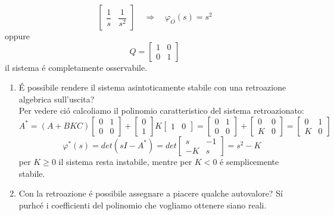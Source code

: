 \documentclass[../main.tex]{subfiles}
\begin{document}
\begin{Exercise}[title={Retroazione algebrica sull'uscita}, difficulty=1]
\begin{itemize}
\[\begin{bmatrix}
							\dfrac{1}{s} & \dfrac{1}{s^2}
						\end{bmatrix}
						\quad\Rightarrow\quad \varphi_O(s) = s^2
					\]
					oppure
					\[
						Q =
						\begin{bmatrix}
							1 & 0\\
							0 & 1
						\end{bmatrix}
					\]
					il sistema \'e completamente osservabile.
			\end{itemize}
			\begin{enumerate}
				\item 
					\'E possibile rendere il sistema asintoticamente stabile con una retroazione algebrica sull'uscita?\\
					Per vedere ci\'o calcoliamo il polinomio caratteristico del sistema retroazionato:
					\[
						A^{*}=(A+BKC)
						\begin{bmatrix}
							0 & 1\\
							0 & 0
						\end{bmatrix} +
						\begin{bmatrix}
							0\\
							1
						\end{bmatrix} K
						\begin{bmatrix}
							1 & 0
						\end{bmatrix} =
						\begin{bmatrix}
							0 & 1\\
							0 & 0
						\end{bmatrix} +
						\begin{bmatrix}
							0 & 0\\
							K & 0
						\end{bmatrix} =
						\begin{bmatrix}
							0 & 1\\
							K & 0
						\end{bmatrix}
					\]
					\[
						\varphi^{*}(s) = det(sI-A^{*}) = det
						\begin{bmatrix}
							s & -1\\
							-K & s
						\end{bmatrix} = s^2 - K
					\]
					per $ K \geq 0 $ il sistema resta instabile, mentre per $ K < 0 $ \'e semplicemente stabile.
				\item 
					Con la retroazione \'e possibile assegnare a piacere qualche autovalore?
					S\'i purhc\'e i coefficienti del polinomio che vogliamo ottenere siano reali.
			\end{enumerate}
		\end{Exercise}
	
\end{document}
